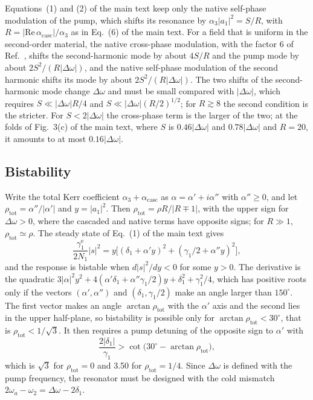 \documentclass[9pt]{osa-supplemental-document}
\newcommand{\Dom}{\Delta\omega}
\newcommand{\acasc}{\alpha_{\mathrm{casc}}}
\begin{document}
Equations~(1) and (2) of the main text keep only the native self-phase
modulation of the pump, which shifts its resonance by
$\alpha_3|a_1|^2=S/R$, with $R=|\mathrm{Re}\,\acasc|/\alpha_3$ as in Eq.~(6)
of the main text.  For a
field that is uniform in the second-order material, the native
cross-phase modulation, with the factor 6 of Ref.~\cite{boyd2020}, shifts
the second-harmonic mode by about $4S/R$ and the pump mode by about
$2S^2/(R|\Dom|)$, and the native self-phase modulation of the second
harmonic shifts its mode by about $2S^2/(R|\Dom|)$.  The two shifts of the
second-harmonic mode change $\Dom$ and must be small compared with
$|\Dom|$, which requires $S\ll|\Dom|R/4$ and $S\ll|\Dom|(R/2)^{1/2}$; for
$R\gtrsim8$ the second condition is the stricter.  For $S<2|\Dom|$ the
cross-phase term is the larger of the two; at the folds of Fig.~3(c) of the
main text, where $S$ is $0.46|\Dom|$ and $0.78|\Dom|$ and $R=20$, it amounts
to at most $0.16|\Dom|$.

\subsection{Bistability}

Write the total Kerr coefficient $\alpha_3+\acasc$ as $\alpha=\alpha'+i\alpha''$
with $\alpha''\ge0$, and let $\rho_{\mathrm{tot}}=\alpha''/|\alpha'|$ and
$y=|a_1|^2$.  Then $\rho_{\mathrm{tot}}=\rho R/|R\mp1|$, with the upper sign for $\Dom>0$,
where the cascaded and native terms have opposite signs; for $R\gg1$,
$\rho_{\mathrm{tot}}\simeq\rho$.  The steady state of Eq.~(1) of the main
text gives
\begin{equation}
  \frac{\gamma_1^{\mathrm e}}{2N_1}|s|^2=y\bigl[(\delta_1+\alpha'y)^2+(\gamma_1/2+\alpha''y)^2\bigr],
\end{equation}
and the response is bistable when $d|s|^2/dy<0$ for some $y>0$.  The
derivative is the quadratic
$3|\alpha|^2y^2+4(\alpha'\delta_1+\alpha''\gamma_1/2)y+\delta_1^2+\gamma_1^2/4$,
which has positive roots only if the vectors $(\alpha',\alpha'')$ and
$(\delta_1,\gamma_1/2)$ make an angle larger than $150^\circ$.  The first
vector makes an angle $\arctan\rho_{\mathrm{tot}}$ with the $\alpha'$ axis
and the second lies in the upper half-plane, so bistability is possible
only for $\arctan\rho_{\mathrm{tot}}<30^\circ$, that is
$\rho_{\mathrm{tot}}<1/\sqrt3$.  It then requires a pump detuning of the
opposite sign to $\alpha'$ with
\begin{equation}
  \frac{2|\delta_1|}{\gamma_1}>\cot\bigl(30^\circ-\arctan\rho_{\mathrm{tot}}\bigr),
\end{equation}
which is $\sqrt3$ for $\rho_{\mathrm{tot}}=0$ and 3.50 for
$\rho_{\mathrm{tot}}=1/4$.  Since $\Dom$ is defined with the pump
frequency, the resonator must be designed with the cold mismatch
$2\omega_a-\omega_2=\Dom-2\delta_1$.
\end{document}

